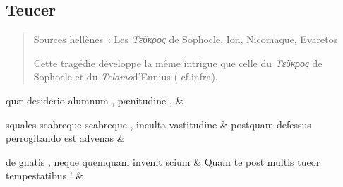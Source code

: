 \documentclass[12pt,onecolumn,twoside,a4paper]{memoir}
\begin{document}
               \subsection*{Teucer}
               \begin{abstract}
                  Sources hellènes : Les \textit{Τεῦκρος} de Sophocle, Ion,
                     Nicomaque, Evaretos\par
                  Cette tragédie développe la même intrigue que celle du \textit{Τεῦκρος} de Sophocle et du \textit{Telamo}d’Ennius (
                     cf.infra).\par
               \end{abstract}
               \begin{pairs}
                  \begin{Leftside}
			\beginnumbering
			\setcounter{stanzaL}{0}
                     
                         \stanza {}quæ
                              desiderio
                              alumnum
                              ,
                              pænitudine
                              , & 
                     
                              squales
                              scabreque
                              {scabreque}
                              ,
                              inculta
                              vastitudine \&
                         \stanza {}postquam
                              defessus
                              perrogitando
                              est
                              advenas & 
                     
                              de
                              gnatis
                              ,
                              neque
                              quemquam
                              invenit
                              scium \&
                         \stanza {}
                     Quam
                              te
                              post
                              multis
                              tueor
                              tempestatibus
                              ! \&
                         \stanza {}
                     

\end{Leftside}
\end{pairs}
\end{document}
